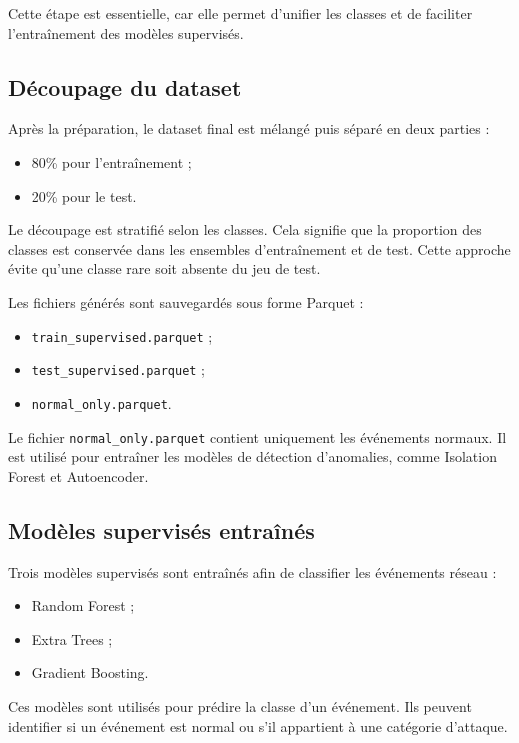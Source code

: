 \documentclass[12pt,a4paper,oneside]{report}
\begin{document}
	Cette étape est essentielle, car elle permet d'unifier les classes et de faciliter l'entraînement des modèles supervisés.
	
	\subsection{Découpage du dataset}
	
	Après la préparation, le dataset final est mélangé puis séparé en deux parties :
	
	\begin{itemize}
		\item 80\% pour l'entraînement ;
		\item 20\% pour le test.
	\end{itemize}
	
	Le découpage est stratifié selon les classes. Cela signifie que la proportion des classes est conservée dans les ensembles d'entraînement et de test. Cette approche évite qu'une classe rare soit absente du jeu de test.
	
	Les fichiers générés sont sauvegardés sous forme Parquet :
	
	\begin{itemize}
		\item \texttt{train\_supervised.parquet} ;
		\item \texttt{test\_supervised.parquet} ;
		\item \texttt{normal\_only.parquet}.
	\end{itemize}
	
	Le fichier \texttt{normal\_only.parquet} contient uniquement les événements normaux. Il est utilisé pour entraîner les modèles de détection d'anomalies, comme Isolation Forest et Autoencoder.
	
	\subsection{Modèles supervisés entraînés}
	
	Trois modèles supervisés sont entraînés afin de classifier les événements réseau :
	
	\begin{itemize}
		\item Random Forest ;
		\item Extra Trees ;
		\item Gradient Boosting.
	\end{itemize}
	
	Ces modèles sont utilisés pour prédire la classe d'un événement. Ils peuvent identifier si un événement est normal ou s'il appartient à une catégorie d'attaque.
	
\end{document}
